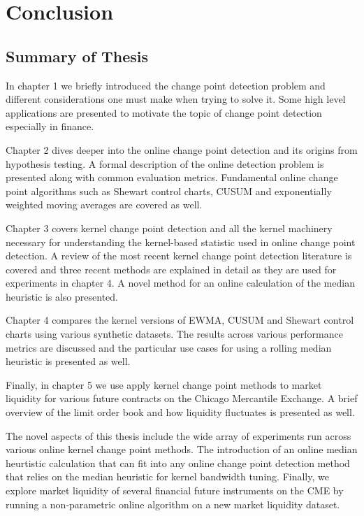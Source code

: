 \chapter{Conclusion}
\section{Summary of Thesis}
In chapter 1 we briefly introduced the change point detection problem and different considerations one must make when trying to solve it. Some high level applications are presented to motivate the topic of change point detection especially in finance.

Chapter 2 dives deeper into the online change point detection and its origins from hypothesis testing. A formal description of the online detection problem is presented along with common evaluation metrics. Fundamental online change point algorithms such as Shewart control charts, CUSUM and exponentially weighted moving averages are covered as well. 

Chapter 3 covers kernel change point detection and all the kernel machinery necessary for understanding the kernel-based statistic used in online change point detection. A review of the most recent kernel change point detection literature is covered and three recent methods are explained in detail as they are used for experiments in chapter 4. A novel method for an online calculation of the median heuristic is also presented. 

Chapter 4 compares the kernel versions of EWMA, CUSUM and Shewart control charts using various synthetic datasets. The results across various performance metrics are discussed and the particular use cases for using a rolling median heuristic is presented as well.

Finally, in chapter 5 we use apply kernel change point methods to market liquidity for various future contracts on the Chicago Mercantile Exchange. A brief overview of the limit order book and how liquidity fluctuates is presented as well.  

The novel aspects of this thesis include the wide array of experiments run across various online kernel change point methods. The introduction of an online median heurtistic calculation that can fit into any online change point detection method that relies on the median heuristic for kernel bandwidth tuning. Finally, we explore market liquidity of several financial future instruments on the CME by running a non-parametric online algorithm on a new market  liquidity dataset.

